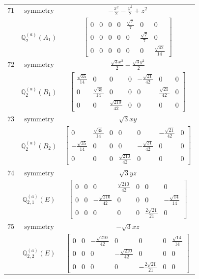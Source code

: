 \documentclass[fleqn,8pt,landscape]{jsarticle}
\begin{document}
\begin{longtable}{ccc}
$ 71 $ & $ \text{symmetry} $ & $ - \frac{x^{2}}{2} - \frac{y^{2}}{2} + z^{2} $ \\
$  $ & $ \mathbb{Q}_{2}^{(a)}(A_{1}) $ & $ \begin{bmatrix} 0 & 0 & 0 & 0 & \frac{\sqrt{7}}{7} & 0 & 0 \\ 0 & 0 & 0 & 0 & 0 & \frac{\sqrt{7}}{7} & 0 \\ 0 & 0 & 0 & 0 & 0 & 0 & \frac{\sqrt{42}}{14} \end{bmatrix} $ \\ \hline
$ 72 $ & $ \text{symmetry} $ & $ \frac{\sqrt{3} x^{2}}{2} - \frac{\sqrt{3} y^{2}}{2} $ \\
$  $ & $ \mathbb{Q}_{2}^{(a)}(B_{1}) $ & $ \begin{bmatrix} \frac{\sqrt{35}}{14} & 0 & 0 & 0 & - \frac{\sqrt{21}}{42} & 0 & 0 \\ 0 & \frac{\sqrt{35}}{14} & 0 & 0 & 0 & \frac{\sqrt{21}}{42} & 0 \\ 0 & 0 & \frac{\sqrt{210}}{42} & 0 & 0 & 0 & 0 \end{bmatrix} $ \\ \hline
$ 73 $ & $ \text{symmetry} $ & $ \sqrt{3} x y $ \\
$  $ & $ \mathbb{Q}_{2}^{(a)}(B_{2}) $ & $ \begin{bmatrix} 0 & \frac{\sqrt{35}}{14} & 0 & 0 & 0 & - \frac{\sqrt{21}}{42} & 0 \\ - \frac{\sqrt{35}}{14} & 0 & 0 & 0 & - \frac{\sqrt{21}}{42} & 0 & 0 \\ 0 & 0 & 0 & \frac{\sqrt{210}}{42} & 0 & 0 & 0 \end{bmatrix} $ \\ \hline
$ 74 $ & $ \text{symmetry} $ & $ \sqrt{3} y z $ \\
$  $ & $ \mathbb{Q}_{2,1}^{(a)}(E) $ & $ \begin{bmatrix} 0 & 0 & 0 & \frac{\sqrt{210}}{42} & 0 & 0 & 0 \\ 0 & 0 & - \frac{\sqrt{210}}{42} & 0 & 0 & 0 & - \frac{\sqrt{14}}{14} \\ 0 & 0 & 0 & 0 & 0 & \frac{2 \sqrt{21}}{21} & 0 \end{bmatrix} $ \\ \hline
$ 75 $ & $ \text{symmetry} $ & $ - \sqrt{3} x z $ \\
$  $ & $ \mathbb{Q}_{2,2}^{(a)}(E) $ & $ \begin{bmatrix} 0 & 0 & - \frac{\sqrt{210}}{42} & 0 & 0 & 0 & \frac{\sqrt{14}}{14} \\ 0 & 0 & 0 & - \frac{\sqrt{210}}{42} & 0 & 0 & 0 \\ 0 & 0 & 0 & 0 & - \frac{2 \sqrt{21}}{21} & 0 & 0 \end{bmatrix} $ \\ \hline

\end{longtable}
\end{document}
